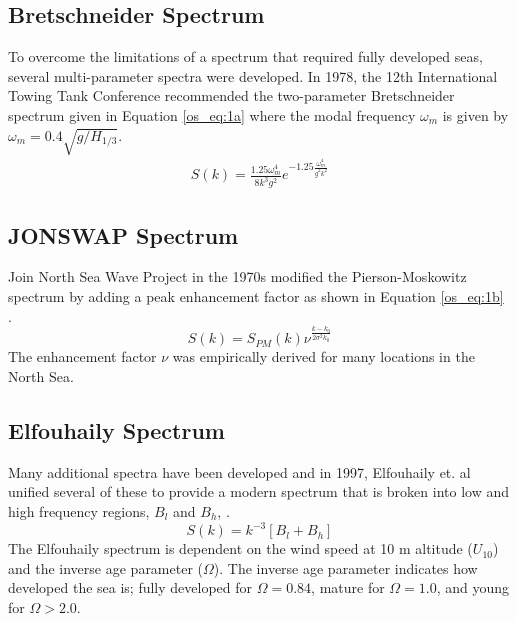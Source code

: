 \subsection{Bretschneider Spectrum}
To overcome the limitations of a spectrum that required fully developed seas, several multi-parameter spectra were developed. In 1978, the 12th International Towing Tank Conference recommended the two-parameter Bretschneider spectrum given in Equation \ref{os_eq:1a} where the modal frequency $\omega_m$ is given by $\omega_m = 0.4\sqrt{g/H_{1/3}}$.
\begin{equation}
  \begin{gathered}
  \label{os_eq:1a}
  S(k) = \frac{1.25 \omega_m^4}{8k^3g^2}e^{-1.25\frac{\omega_m^4}{g^2k^2}} 
  \end{gathered}
\end{equation}
\renewcommand{\baselinestretch}{2} \small\normalsize

\subsection{JONSWAP Spectrum}
Join North Sea Wave Project in the 1970s modified the Pierson-Moskowitz spectrum by adding a peak enhancement factor as shown in Equation \ref{os_eq:1b} \cite{michel_sea_spectra}.
\begin{equation}
  \label{os_eq:1b}
  S(k) = S_{PM}(k)\nu^{\frac{k-k_0}{2\sigma^2k_0}} 
  \end{equation}
The enhancement factor $\nu$ was empirically derived for many locations in the North Sea.

\subsection{Elfouhaily Spectrum}
Many additional spectra have been developed and in 1997, Elfouhaily et. al unified several of these to provide a modern spectrum that is broken into low and high frequency regions, $B_l$ and $B_h$, \cite{elfouhaily}.
\begin{equation}
  \label{os_eq:2}
  S(k) = k^{-3}\left[B_l + B_h \right]
\end{equation}
\renewcommand{\baselinestretch}{2} \small\normalsize
The Elfouhaily spectrum is dependent on the wind speed at 10 m altitude ($U_{10}$) and the inverse age parameter ($\Omega$). The inverse age parameter indicates how developed the sea is; fully developed for $\Omega = 0.84$, mature for $\Omega = 1.0$, and young for $\Omega > 2.0$. 

